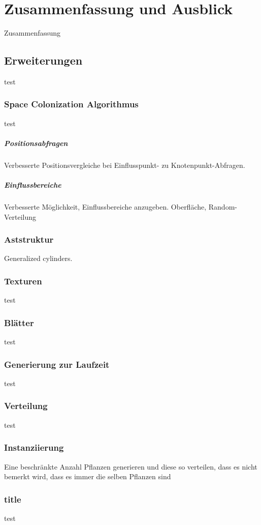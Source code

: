 \chapter{Zusammenfassung und Ausblick}

Zusammenfassung

\section{Erweiterungen}
test
\subsection{Space Colonization Algorithmus}
test
\paragraph{Positionsabfragen}
Verbesserte Positionsvergleiche bei Einflusspunkt- zu Knotenpunkt-Abfragen.

\paragraph{Einflussbereiche} 
Verbesserte Möglichkeit, Einflussbereiche anzugeben. Oberfläche, Random-Verteilung

\subsection{Aststruktur}

Generalized cylinders.

\subsection{Texturen}
test
\subsection{Blätter}
test
\subsection{Generierung zur Laufzeit}
test
\subsection{Verteilung}
test
\subsection{Instanziierung}
Eine beschränkte Anzahl Pflanzen generieren und diese so verteilen, dass es nicht bemerkt wird, dass es immer die selben Pflanzen sind

\subsection{title}
test